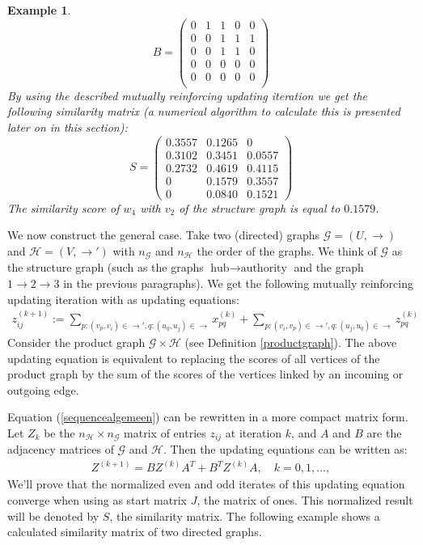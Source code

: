 \documentclass[a4paper,11pt]{report}
\newtheorem{example}[theorem]{Example}
\newcommand{\graf}{\mathscr{G}}
\newcommand{\grafeen}{\mathscr{H}}
\begin{document}
\begin{example}
$$B = \begin{pmatrix}
0 & 1 & 1 & 0 & 0\\
0 & 0 & 1 & 1 & 1\\
0 & 0 & 1 & 1 & 0\\
0 & 0 & 0 & 0 & 0\\
0 & 0 & 0 & 0 & 0\\
\end{pmatrix}$$
 By using the described mutually reinforcing updating iteration we get the 
 following similarity matrix (a numerical algorithm to calculate this is presented later 
 on in this section):
 $$ S = \begin{pmatrix}
 0.3557 & 0.1265 & 0\\
 0.3102 & 0.3451  & 0.0557\\
 0.2732 & 0.4619 & 0.4115\\
0 & 0.1579 & 0.3557\\
 0 & 0.0840 & 0.1521
\end{pmatrix}$$
The similarity score of $w_4$ with $v_2$ of the structure graph is equal to 
$0.1579$.
 \end{example}

 We now construct the general case. Take two (directed) graphs $\graf=(U, \to)$ and $\grafeen=(V, \to')$ 
 with $n_\graf$ and $n_\grafeen$ the order of the graphs. We think of $\graf$ as the structure 
 graph (such as the graphs $\text{hub}\to \text{authority}$ and the graph $1\to 2\to 
 3$ in the previous paragraphs). We get the following mutually reinforcing updating iteration with as updating equations:
 \begin{eqnarray}\label{vergblondel}
 z^{(k+1)}_{ij} := \sum_{p:(v_p,v_i)\in \to', q:(u_q,u_j) \in \to} x^{(k)}_{pq} +  \sum_{p:(v_i,v_p)\in \to', q:(u_j,u_q) \in \to} z^{(k)}_{pq} 
 \end{eqnarray}
 Consider the product graph $\graf \times \grafeen$ (see Definition \ref{productgraph}). The above updating equation is equivalent to replacing
 the scores of all vertices of the product graph by the sum of the scores of the vertices linked by an incoming
 or outgoing edge. 
 
 Equation (\ref{sequencealgemeen}) can be rewritten in a more compact matrix form. Let $Z_k$
 be the $n_\grafeen \times n_\graf$ matrix of entries $z_{ij}$ at iteration $k$, and $A$ and $B$ are the adjacency matrices
 of $\graf$ and $\grafeen$. Then the 
 updating equations can be written as:
 \begin{eqnarray}\label{compacteforms}
Z^{(k+1)} = BZ^{(k)}A^T + B^TZ^{(k)}A,\quad k=0,1,\ldots,
  \end{eqnarray}
We'll prove that the normalized even and odd iterates of 
 this updating equation converge when using as start matrix $J$, the matrix of ones. This normalized
result will be denoted by $S$,  the similarity matrix. The following example shows a calculated similarity 
 matrix of two directed graphs.
 
\end{document}
